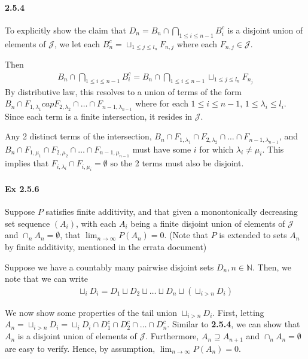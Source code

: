 \documentclass[a4paper]{article}
\newcommand{\semialg}[0]{\mathcal{J}} %
\begin{document}
\paragraph{2.5.4} To explicitly show the claim that $D_n = B_n\cap \bigcap_{1\leq i\leq n-1}B_i^c$ is a disjoint union of elements of $\semialg$, we let each $B_n^c = \sqcup_{1\leq j\leq l_n}F_{n,j}$ where each $F_{n,j}\in \semialg$.

Then
\begin{align*}
	B_n\cap \bigcap_{1\leq i\leq n-1}B_i^c = B_n\cap \bigcap_{1\leq i\leq n-1}\sqcup_{1\leq j\leq l_n}F_{n_j}
\end{align*}
By distributive law, this resolves to a union of terms of the form
$B_n\cap F_{1, \lambda_1}cap F_{2, \lambda_2}\cap \dots \cap F_{n-1, \lambda_{n-1}}$ where for each $1\leq i\leq n-1$, $1\leq \lambda_i \leq l_i$. Since each term is a finite  intersection, it resides in $\semialg$.

Any 2 distinct terms of the intersection, $B_n\cap F_{1, \lambda_1}\cap F_{2, \lambda_2}\cap \dots \cap F_{n-1, \lambda_{n-1}}$, and $B_n\cap F_{1, \mu_1}\cap F_{2, \mu_2}\cap \dots \cap F_{n-1, \mu_{n-1}}$ must have some $i$ for which $\lambda_i\neq\mu_i$. This implies that $F_{i, \lambda_i}\cap F_{i, \mu_i} = \emptyset$ so the 2 terms must also be disjoint.

\paragraph{Ex 2.5.6} Suppose $P$ satisfies finite additivity, and that given a monontonically decreasing set sequence $(A_i)$, with each $A_i$ being a finite disjoint union of elements of $\semialg$ and $\cap_n A_n = \emptyset$, that $\lim_{n\rightarrow \infty}P(A_n) = 0$. (Note that $P$ is extended to sets $A_n$ by finite additivity, mentioned in the errata document)

Suppose we have a countably many pairwise disjoint sets $D_n, n\in \mathbb{N}$. Then, we note that we can write
\begin{align*}
	\sqcup_i D_i = D_1 \sqcup D_2 \sqcup \dots \sqcup D_n \sqcup \left(\sqcup_{i>n}D_i\right) 
\end{align*}

We now show some properties of the tail union $\sqcup_{i>n}D_i$.
First, letting $A_n = \sqcup_{i>n}D_i = \sqcup_i D_i \cap D_1^c \cap D_2^c \cap \dots \cap D_n^c$. Similar to \textbf{2.5.4}, we can show that $A_n$ is a disjoint union of elements of $\semialg$.
Furthermore, $A_n\supseteq A_{n+1}$ and $\cap_n A_n = \emptyset$ are easy to verify. Hence, by assumption, $\lim_{n\rightarrow \infty}P(A_n) = 0$.
\end{document}
